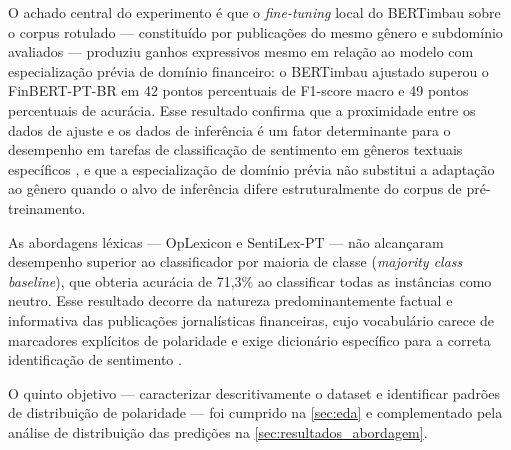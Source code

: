 O achado central do experimento é que o \textit{fine-tuning} local do BERTimbau sobre o corpus rotulado --- constituído por publicações do mesmo gênero e subdomínio avaliados --- produziu ganhos expressivos mesmo em relação ao modelo com especialização prévia de domínio financeiro: o BERTimbau ajustado superou o FinBERT-PT-BR em 42 pontos percentuais de F1-score macro e 49 pontos percentuais de acurácia. Esse resultado confirma que a proximidade entre os dados de ajuste e os dados de inferência é um fator determinante para o desempenho em tarefas de classificação de sentimento em gêneros textuais específicos \cite{devlin2019}, e que a especialização de domínio prévia não substitui a adaptação ao gênero quando o alvo de inferência difere estruturalmente do corpus de pré-treinamento.

As abordagens léxicas --- OpLexicon e SentiLex-PT --- não alcançaram desempenho superior ao classificador por maioria de classe (\textit{majority class baseline}), que obteria acurácia de 71,3\% ao classificar todas as instâncias como neutro. Esse resultado decorre da natureza predominantemente factual e informativa das publicações jornalísticas financeiras, cujo vocabulário carece de marcadores explícitos de polaridade e exige dicionário específico para a correta identificação de sentimento \cite{loughran2011,liu2020survey}.

O quinto objetivo --- caracterizar descritivamente o dataset e identificar padrões de distribuição de polaridade --- foi cumprido na \autoref{sec:eda} e complementado pela análise de distribuição das predições na \autoref{sec:resultados_abordagem}.